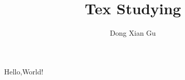 \documentclass{article}
\author{Dong Xian Gu}
\title{Tex Studying}
\begin{document}
\maketitle %
Hello,World!
\end{document}
